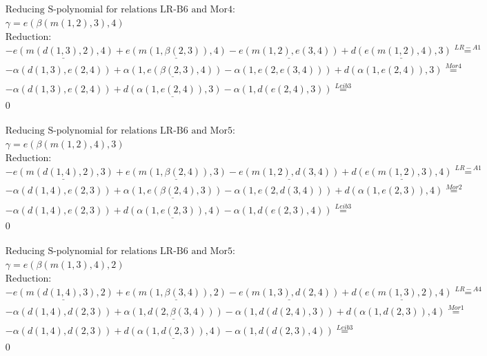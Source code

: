 \documentclass[11pt]{amsart}
\begin{document}
\begin{align*} 
& \text{Reducing S-polynomial for relations LR-B6 and Mor4:} \\ 
& \gamma = e(\beta(m(1,2),3),4) \\ 
& \text{Reduction}: \\& - \underline{e(m(d(1,3),2),4)} + \underline{e(m(1,\beta(2,3)),4)} - \underline{e(m(1,2),e(3,4))} + \underline{d(e(m(1,2),4),3)} \stackrel{ LR-A1 }{=}  \\ 
& - \alpha(d(1,3),e(2,4)) + \underline{\alpha(1,e(\beta(2,3),4))} - \alpha(1,e(2,e(3,4))) + d(\alpha(1,e(2,4)),3) \stackrel{ Mor4 }{=}  \\ 
& - \alpha(d(1,3),e(2,4)) + \underline{d(\alpha(1,e(2,4)),3)} - \alpha(1,d(e(2,4),3)) \stackrel{ Leib3 }{=}  \\ 
&0\\ 
\end{align*} 
 
\begin{align*} 
& \text{Reducing S-polynomial for relations LR-B6 and Mor5:} \\ 
& \gamma = e(\beta(m(1,2),4),3) \\ 
& \text{Reduction}: \\& - \underline{e(m(d(1,4),2),3)} + \underline{e(m(1,\beta(2,4)),3)} - \underline{e(m(1,2),d(3,4))} + \underline{d(e(m(1,2),3),4)} \stackrel{ LR-A1 }{=}  \\ 
& - \alpha(d(1,4),e(2,3)) + \underline{\alpha(1,e(\beta(2,4),3))} - \alpha(1,e(2,d(3,4))) + d(\alpha(1,e(2,3)),4) \stackrel{ Mor2 }{=}  \\ 
& - \alpha(d(1,4),e(2,3)) + \underline{d(\alpha(1,e(2,3)),4)} - \alpha(1,d(e(2,3),4)) \stackrel{ Leib3 }{=}  \\ 
&0\\ 
\end{align*} 
 
\begin{align*} 
& \text{Reducing S-polynomial for relations LR-B6 and Mor5:} \\ 
& \gamma = e(\beta(m(1,3),4),2) \\ 
& \text{Reduction}: \\& - \underline{e(m(d(1,4),3),2)} + \underline{e(m(1,\beta(3,4)),2)} - \underline{e(m(1,3),d(2,4))} + \underline{d(e(m(1,3),2),4)} \stackrel{ LR-A4 }{=}  \\ 
& - \alpha(d(1,4),d(2,3)) + \underline{\alpha(1,d(2,\beta(3,4)))} - \alpha(1,d(d(2,4),3)) + d(\alpha(1,d(2,3)),4) \stackrel{ Mor1 }{=}  \\ 
& - \alpha(d(1,4),d(2,3)) + \underline{d(\alpha(1,d(2,3)),4)} - \alpha(1,d(d(2,3),4)) \stackrel{ Leib3 }{=}  \\ 
&0\\ 
\end{align*} 
 
\end{document}
